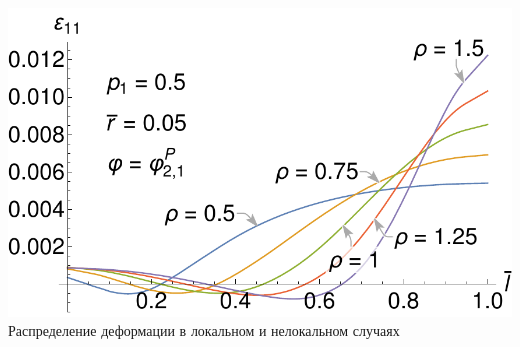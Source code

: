 \begin{frame}
\begin{minipage}{0.39\textwidth}
	\includegraphics[width=\textwidth]{pics/KirshABEps11r005p05Presentation.pdf} \\
	
	Распределение деформации в локальном и нелокальном случаях
\end{minipage}
\end{frame}


